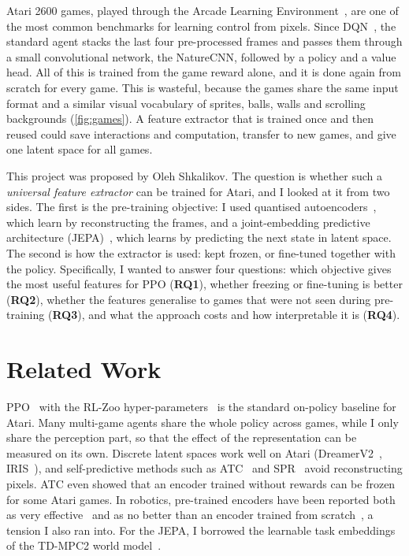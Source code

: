 \documentclass[runningheads]{llncs}
\begin{document}
Atari 2600 games, played through the Arcade Learning Environment~\cite{machado2018revisiting},
are one of the most common benchmarks for learning control from pixels. Since
DQN~\cite{mnih2015human}, the standard agent stacks the last four pre-processed frames and
passes them through a small convolutional network, the NatureCNN, followed by a policy and a
value head. All of this is trained from the game reward alone, and it is done again from
scratch for every game. This is wasteful, because the games share the same input format and a similar
visual vocabulary of sprites, balls, walls and scrolling backgrounds (\cref{fig:games}). A
feature extractor that is trained once and then reused could save interactions and
computation, transfer to new games, and give one latent space for all games.

This project was proposed by Oleh Shkalikov. The question is whether such a
\emph{universal feature extractor} can be trained for Atari, and I looked at it from two sides.
The first is the pre-training objective: I used quantised
autoencoders~\cite{vandenoord2017vqvae,mentzer2024fsq}, which learn by reconstructing the
frames, and a joint-embedding predictive architecture
(JEPA)~\cite{lecun2022path,assran2023ijepa,bardes2024vjepa}, which learns by predicting the
next state in latent space. The second is how the extractor is used: kept frozen, or fine-tuned
together with the policy. Specifically, I wanted to answer four questions: which objective
gives the most useful features for PPO (\textbf{RQ1}), whether freezing or fine-tuning is
better (\textbf{RQ2}), whether the features generalise to games that were not seen during
pre-training (\textbf{RQ3}), and what the approach costs and how interpretable it is
(\textbf{RQ4}).

\section{Related Work}
\label{sec:related}

PPO~\cite{schulman2017ppo} with the RL-Zoo hyper-parameters~\cite{raffin2020zoo} is the
standard on-policy baseline for Atari. Many multi-game agents share the whole policy across
games, while I only share the perception part, so that the effect of the representation can
be measured on its own. Discrete latent spaces work well on Atari
(DreamerV2~\cite{hafner2021dreamerv2}, IRIS~\cite{micheli2023iris}), and self-predictive methods
such as ATC~\cite{stooke2021atc} and SPR~\cite{schwarzer2021spr} avoid reconstructing pixels.
ATC even showed that an encoder trained without rewards can be frozen for some Atari games. In
robotics, pre-trained encoders have been reported both as very effective~\cite{parisi2022pvr}
and as no better than an encoder trained from scratch~\cite{hansen2022pretrained}, a tension I
also ran into. For the JEPA, I borrowed the learnable task embeddings of the TD-MPC2 world
model~\cite{hansen2024tdmpc2}.
\end{document}
